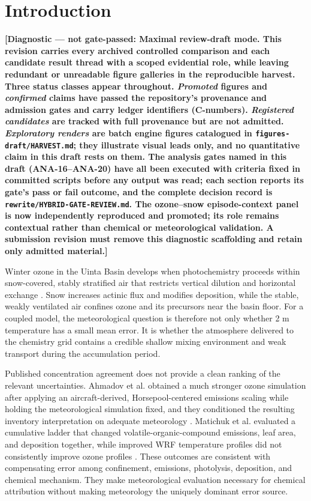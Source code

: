\documentclass[air,article,submit,moreauthors]{Definitions/mdpi}
\newcommand{\diagnosticnote}[1]{\textbf{[Diagnostic --- not gate-passed: #1]}}
\begin{document}
\section{Introduction}

\diagnosticnote{Maximal review-draft mode.
This revision carries every archived controlled comparison and each candidate result thread with a scoped evidential role, while leaving redundant or unreadable figure galleries in the reproducible harvest.
Three status classes appear throughout.
\emph{Promoted} figures and \emph{confirmed} claims have passed the repository's provenance and admission gates and carry ledger identifiers (C-numbers).
\emph{Registered candidates} are tracked with full provenance but are not admitted.
\emph{Exploratory renders} are batch engine figures catalogued in \texttt{figures-draft/HARVEST.md}; they illustrate visual leads only, and no quantitative claim in this draft rests on them.
The analysis gates named in this draft (ANA-16--ANA-20) have all been executed with criteria fixed in committed scripts before any output was read; each section reports its gate's pass or fail outcome, and the complete decision record is \texttt{rewrite/HYBRID-GATE-REVIEW.md}.
The ozone--snow episode-context panel is now independently reproduced and promoted; its role remains contextual rather than chemical or meteorological validation.
A submission revision must remove this diagnostic scaffolding and retain only admitted material.}

Winter ozone in the Uinta Basin develops when photochemistry proceeds within snow-covered, stably stratified air that restricts vertical dilution and horizontal exchange \citep{Ahmadov2015-zm,Neemann2015-ws,Davies2025-wy}.
Snow increases actinic flux and modifies deposition, while the stable, weakly ventilated air confines ozone and its precursors near the basin floor.
For a coupled model, the meteorological question is therefore not only whether 2 m temperature has a small mean error.
It is whether the atmosphere delivered to the chemistry grid contains a credible shallow mixing environment and weak transport during the accumulation period.

Published concentration agreement does not provide a clean ranking of the relevant uncertainties.
Ahmadov et al. obtained a much stronger ozone simulation after applying an aircraft-derived, Horsepool-centered emissions scaling while holding the meteorological simulation fixed, and they conditioned the resulting inventory interpretation on adequate meteorology \citep{Ahmadov2015-zm}.
Matichuk et al. evaluated a cumulative ladder that changed volatile-organic-compound emissions, leaf area, and deposition together, while improved WRF temperature profiles did not consistently improve ozone profiles \citep{Matichuk2017-bq}.
These outcomes are consistent with compensating error among confinement, emissions, photolysis, deposition, and chemical mechanism.
They make meteorological evaluation necessary for chemical attribution without making meteorology the uniquely dominant error source.
\end{document}
